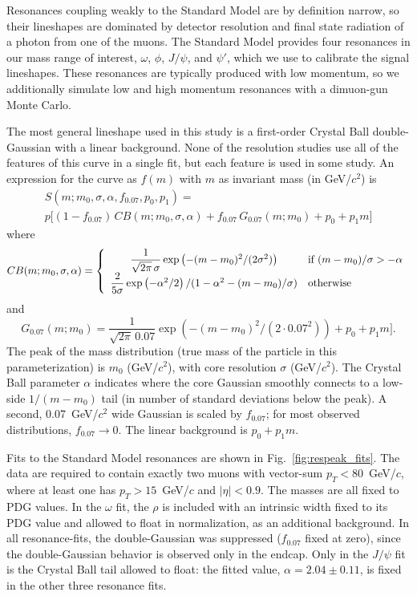 \documentclass[12pt]{cms-tdr}
\begin{document}
Resonances coupling weakly to the Standard Model are by definition
narrow, so their lineshapes are dominated by detector resolution and
final state radiation of a photon from one of the muons.  The Standard
Model provides four resonances in our mass range of interest,
$\omega$, $\phi$, $J/\psi$, and $\psi'$, which we use to calibrate the
signal lineshapes.  These resonances are typically produced with low
momentum, so we additionally simulate low and high momentum resonances
with a dimuon-gun Monte Carlo.

The most general lineshape used in this study is a first-order Crystal
Ball double-Gaussian with a linear background.  None of the resolution
studies use all of the features of this curve in a single fit, but
each feature is used in some study.  An expression for the curve as
$f(m)$ with $m$ as invariant mass (in GeV/$c^2$) is
\begin{multline}
S(m; m_0, \sigma, \alpha, f_{0.07}, p_0, p_1) = \\ p \bigg[ (1 -
  f_{0.07}) \, CB(m; m_0, \sigma, \alpha) + f_{0.07}
  \, G_{0.07}(m; m_0) + p_0 + p_1 m \bigg]
\end{multline}
where
\begin{equation}
CB(m; m_0, \sigma, \alpha) = \left\{ \begin{array}{c l} \dfrac{1}{\sqrt{2\pi}\, \sigma} \exp\left(-(m - m_0)^2 / (2 \sigma^2)\right) & \mbox{if $(m - m_0)/\sigma > -\alpha$} \\
\dfrac{2}{5 \sigma} \exp\left(-\alpha^2/2\right)/(1 - \alpha^2 - (m-m_0)/\sigma) & \mbox{otherwise} \end{array} \right.
\end{equation}
and
\begin{equation}
G_{0.07}(m; m_0) = \frac{1}{\sqrt{2\pi}\, 0.07} \exp\left(-(m - m_0)^2 / (2 \cdot 0.07^2)\right) + p_0 + p_1 m \bigg]\mbox{.}
\end{equation}
The peak of the mass distribution (true mass of the particle in this
parameterization) is $m_0$ (GeV/$c^2$), with core resolution $\sigma$
(GeV/$c^2$).  The Crystal Ball parameter $\alpha$ indicates where the
core Gaussian smoothly connects to a low-side $1/(m-m_0)$ tail (in
number of standard deviations below the peak).  A second,
0.07~GeV/$c^2$ wide Gaussian is scaled by $f_{0.07}$; for most
observed distributions, $f_{0.07} \to 0$.  The linear background is
$p_0 + p_1 m$.

Fits to the Standard Model resonances are shown in
Fig.~\ref{fig:respeak_fits}.  The data are required to contain
exactly two muons with vector-sum $p_T < 80$~GeV/$c$, where at least
one has $p_T > 15$~GeV/$c$ and $|\eta| < 0.9$.  The masses are all
fixed to PDG values.  In the $\omega$ fit, the $\rho$ is included
with an intrinsic width fixed to its PDG value and allowed to float in
normalization, as an additional background.  In all resonance-fits,
the double-Gaussian was suppressed ($f_{0.07}$ fixed at zero), since
the double-Gaussian behavior is observed only in the endcap.  Only in
the $J/\psi$ fit is the Crystal Ball tail allowed to float: the fitted
value, $\alpha = 2.04 \pm 0.11$, is fixed in the other three resonance
fits.  
\end{document}
